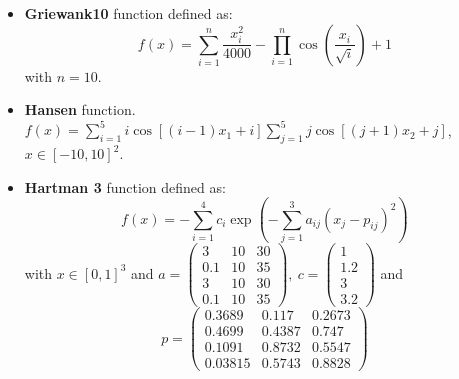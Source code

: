 \documentclass[journal,article,submit,pdftex,moreauthors]{Definitions/mdpi}
\begin{document}
\begin{itemize}
\item \textbf{Griewank10} function defined as:
\[
f(x)=\sum_{i=1}^{n}\frac{x_{i}^{2}}{4000}-\prod_{i=1}^{n}\cos\left(\frac{x_{i}}{\sqrt{i}}\right)+1
\]
with $n=10$.
\item \textbf{Hansen} function. $f(x)=\sum_{i=1}^{5}i\cos\left[(i-1)x_{1}+i\right]\sum_{j=1}^{5}j\cos\left[(j+1)x_{2}+j\right]$,
$x\in[-10,10]^{2}$. 
\item \textbf{Hartman 3} function defined as:
\[
f(x)=-\sum_{i=1}^{4}c_{i}\exp\left(-\sum_{j=1}^{3}a_{ij}\left(x_{j}-p_{ij}\right)^{2}\right)
\]
with $x\in[0,1]^{3}$ and $a=\left(\begin{array}{ccc}
3 & 10 & 30\\
0.1 & 10 & 35\\
3 & 10 & 30\\
0.1 & 10 & 35
\end{array}\right),\ c=\left(\begin{array}{c}
1\\
1.2\\
3\\
3.2
\end{array}\right)$ and
\[
p=\left(\begin{array}{ccc}
0.3689 & 0.117 & 0.2673\\
0.4699 & 0.4387 & 0.747\\
0.1091 & 0.8732 & 0.5547\\
0.03815 & 0.5743 & 0.8828
\end{array}\right)
\]


\end{itemize}
\end{document}
